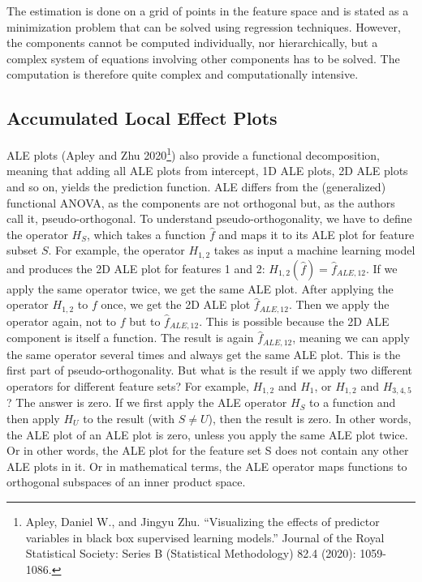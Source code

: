 \documentclass[
  11pt,
]{scrbook}
\begin{document}
The estimation is done on a grid of points in the feature space and is stated as a minimization problem that can be solved using regression techniques.
However, the components cannot be computed individually, nor hierarchically, but a complex system of equations involving other components has to be solved.
The computation is therefore quite complex and computationally intensive.

\hypertarget{accumulated-local-effect-plots}{%
\subsection{Accumulated Local Effect Plots}\label{accumulated-local-effect-plots}}

ALE plots (Apley and Zhu 2020\footnote{Apley, Daniel W., and Jingyu Zhu. ``Visualizing the effects of predictor variables in black box supervised learning models.'' Journal of the Royal Statistical Society: Series B (Statistical Methodology) 82.4 (2020): 1059-1086.}) also provide a functional decomposition, meaning that adding all ALE plots from intercept, 1D ALE plots, 2D ALE plots and so on, yields the prediction function.
ALE differs from the (generalized) functional ANOVA, as the components are not orthogonal but, as the authors call it, pseudo-orthogonal.
To understand pseudo-orthogonality, we have to define the operator \(H_S\), which takes a function \(\hat{f}\) and maps it to its ALE plot for feature subset \(S\).
For example, the operator \(H_{1,2}\) takes as input a machine learning model and produces the 2D ALE plot for features 1 and 2: \(H_{1,2}(\hat{f}) = \hat{f}_{ALE,12}\).
If we apply the same operator twice, we get the same ALE plot.
After applying the operator \(H_{1,2}\) to \(f\) once, we get the 2D ALE plot \(\hat{f}_{ALE,12}\).
Then we apply the operator again, not to \(f\) but to \(\hat{f}_{ALE,12}\).
This is possible because the 2D ALE component is itself a function.
The result is again \(\hat{f}_{ALE,12}\), meaning we can apply the same operator several times and always get the same ALE plot.
This is the first part of pseudo-orthogonality.
But what is the result if we apply two different operators for different feature sets?
For example, \(H_{1,2}\) and \(H_{1}\), or \(H_{1,2}\) and \(H_{3,4,5}\)?
The answer is zero.
If we first apply the ALE operator \(H_S\) to a function and then apply \(H_U\) to the result (with \(S \neq U\)), then the result is zero.
In other words, the ALE plot of an ALE plot is zero, unless you apply the same ALE plot twice.
Or in other words, the ALE plot for the feature set S does not contain any other ALE plots in it.
Or in mathematical terms, the ALE operator maps functions to orthogonal subspaces of an inner product space.
\end{document}
